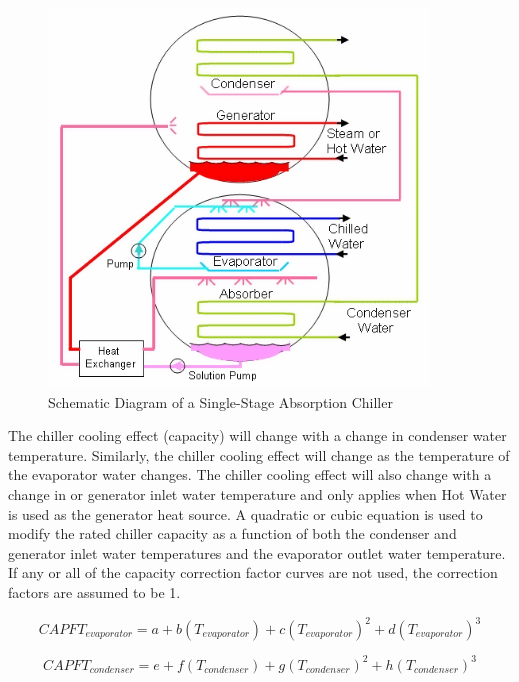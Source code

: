 \begin{figure}[hbtp] %
\centering
\includegraphics[width=0.9\textwidth, height=0.9\textheight, keepaspectratio=true]{media/image3060.png}
\caption{Schematic Diagram of a Single-Stage Absorption Chiller \protect \label{fig:schematic-diagram-of-a-single-stage}}
\end{figure}

The chiller cooling effect (capacity) will change with a change in condenser water temperature. Similarly, the chiller cooling effect will change as the temperature of the evaporator water changes. The chiller cooling effect will also change with a change in or generator inlet water temperature and only applies when Hot Water is used as the generator heat source. A quadratic or cubic equation is used to modify the rated chiller capacity as a function of both the condenser and generator inlet water temperatures and the evaporator outlet water temperature. If any or all of the capacity correction factor curves are not used, the correction factors are assumed to be 1.

\begin{equation}
CAPF{T_{evaporator}} = a + b\left( {{T_{evaporator}}} \right) + c{\left( {{T_{evaporator}}} \right)^2} + d{\left( {{T_{evaporator}}} \right)^3}
\end{equation}

\begin{equation}
CAPF{T_{condenser}} = e + f\left( {{T_{condenser}}} \right) + g{\left( {{T_{condenser}}} \right)^2} + h{\left( {{T_{condenser}}} \right)^3}
\end{equation}

